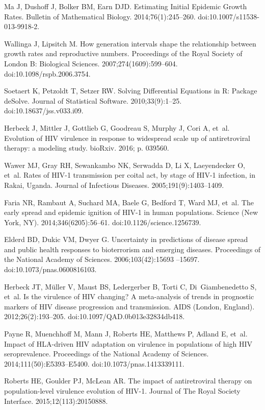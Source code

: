 \documentclass[10pt,letterpaper]{article}
\begin{document}
\begin{thebibliography}{10}
Ma J, Dushoff J, Bolker BM, Earn DJD.
\newblock Estimating Initial Epidemic Growth Rates.
\newblock Bulletin of Mathematical Biology. 2014;76(1):245--260.
\newblock doi:{10.1007/s11538-013-9918-2}.

Wallinga J, Lipsitch M.
\newblock How generation intervals shape the relationship between growth rates
  and reproductive numbers.
\newblock Proceedings of the Royal Society of London B: Biological Sciences.
  2007;274(1609):599--604.
\newblock doi:{10.1098/rspb.2006.3754}.

Soetaert K, Petzoldt T, Setzer RW.
\newblock Solving Differential Equations in {R}: Package {deSolve}.
\newblock Journal of Statistical Software. 2010;33(9):1--25.
\newblock doi:{10.18637/jss.v033.i09}.

Herbeck J, Mittler J, Gottlieb G, Goodreau S, Murphy J, Cori A, et~al.
\newblock Evolution of {HIV} virulence in response to widespread scale up of
  antiretroviral therapy: a modeling study.
\newblock bioRxiv. 2016; p. 039560.

Wawer MJ, Gray RH, Sewankambo NK, Serwadda D, Li X, Laeyendecker O, et~al.
\newblock Rates of {HIV}-1 transmission per coital act, by stage of {HIV}-1
  infection, in {Rakai}, {Uganda}.
\newblock Journal of Infectious Diseases. 2005;191(9):1403--1409.

Faria NR, Rambaut A, Suchard MA, Baele G, Bedford T, Ward MJ, et~al.
\newblock The early spread and epidemic ignition of {HIV}-1 in human
  populations.
\newblock Science (New York, NY). 2014;346(6205):56--61.
\newblock doi:{10.1126/science.1256739}.

Elderd BD, Dukic VM, Dwyer G.
\newblock Uncertainty in predictions of disease spread and public health
  responses to bioterrorism and emerging diseases.
\newblock Proceedings of the National Academy of Sciences. 2006;103(42):15693
  --15697.
\newblock doi:{10.1073/pnas.0600816103}.

Herbeck JT, Müller V, Maust BS, Ledergerber B, Torti C, Di~Giambenedetto S,
  et~al.
\newblock Is the virulence of {HIV} changing? {A} meta-analysis of trends in
  prognostic markers of {HIV} disease progression and transmission.
\newblock AIDS (London, England). 2012;26(2):193--205.
\newblock doi:{10.1097/QAD.0b013e32834db418}.

Payne R, Muenchhoff M, Mann J, Roberts HE, Matthews P, Adland E, et~al.
\newblock Impact of {HLA}-driven {HIV} adaptation on virulence in populations
  of high {HIV} seroprevalence.
\newblock Proceedings of the National Academy of Sciences.
  2014;111(50):E5393--E5400.
\newblock doi:{10.1073/pnas.1413339111}.

Roberts HE, Goulder PJ, McLean AR.
\newblock The impact of antiretroviral therapy on population-level virulence
  evolution of {HIV}-1.
\newblock Journal of The Royal Society Interface. 2015;12(113):20150888.

\end{thebibliography}
\end{document}
